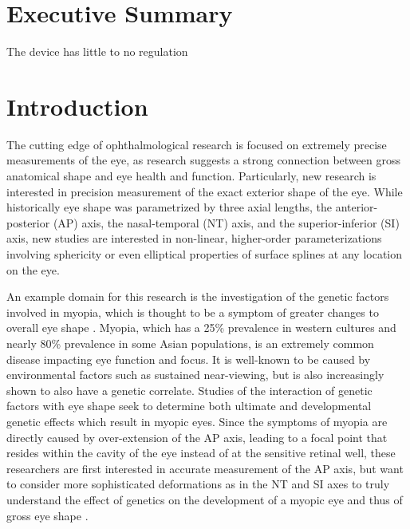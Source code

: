 \documentclass{article}
\begin{document}
 
 
\setcounter{tocdepth}{2}
\tableofcontents
\newpage
\listoftables
\listoffigures
\newpage
 
 
\section*{Executive Summary}
\label{sec:exec-summary}
 
 
The device has little to no regulation 
 
\newpage
 
 
\section{Introduction}
\label{sec:Introduction}
 
The cutting edge of ophthalmological research is focused on extremely precise measurements of the eye, as research suggests a strong connection between gross anatomical shape and eye health and function. Particularly, new research is interested in precision measurement of the exact exterior shape of the eye\cite{atchison04,zhou99:genes,zhou99:models,guggenheim04,wallman04}. While historically eye shape was parametrized by three axial lengths, the anterior-posterior (AP) axis, the nasal-temporal (NT) axis, and the superior-inferior (SI) axis, new studies are interested in non-linear, higher-order parameterizations involving sphericity or even elliptical properties of surface splines at any location on the eye.
 
An example domain for this research is the investigation of the genetic factors involved in myopia, which is thought to be a symptom of greater changes to overall eye shape \cite{atchison04}. Myopia, which has a 25\% prevalence in western cultures and nearly 80\% prevalence in some Asian populations\cite{rajan98}, is an extremely common disease impacting eye function and focus. It is well-known to be caused by environmental factors such as sustained near-viewing, but is also increasingly shown to also have a genetic correlate\cite{zhou99:genes,zhou99:models,schmucker04}. Studies of the interaction of genetic factors with eye shape seek to determine both ultimate and developmental genetic effects which result in myopic eyes. Since the symptoms of myopia are directly caused by over-extension of the AP axis, leading to a focal point that resides within the cavity of the eye instead of at the sensitive retinal well, these researchers are first interested in accurate measurement of the AP axis\cite{wallman04}, but want to consider more sophisticated deformations as in the NT and SI axes to truly understand the effect of genetics on the development of a myopic eye\cite{schaeffel04} and thus of gross eye shape \cite{atchison04}.  
 
\end{document}
